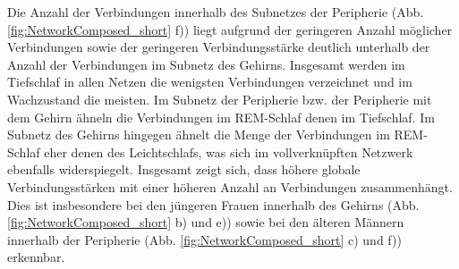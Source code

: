 Die Anzahl der Verbindungen innerhalb des Subnetzes der Peripherie (Abb. \ref{fig:NetworkComposed_short} f)) liegt aufgrund der geringeren Anzahl möglicher Verbindungen sowie der geringeren Verbindungsstärke deutlich unterhalb der Anzahl der Verbindungen im Subnetz des Gehirns. Insgesamt werden im Tiefschlaf in allen Netzen die wenigsten Verbindungen verzeichnet und im Wachzustand die meisten. Im Subnetz der Peripherie bzw. der Peripherie mit dem Gehirn ähneln die Verbindungen im \acs{REM}-Schlaf denen im Tiefschlaf. Im Subnetz des Gehirns hingegen ähnelt die Menge der Verbindungen im \acs{REM}-Schlaf eher denen des Leichtschlafs, was sich im vollverknüpften Netzwerk ebenfalls widerspiegelt. Insgesamt zeigt sich, dass höhere globale Verbindungsstärken mit einer höheren Anzahl an Verbindungen zusammenhängt. Dies ist insbesondere bei den jüngeren Frauen innerhalb des Gehirns (Abb. \ref{fig:NetworkComposed_short} b) und e)) sowie bei den älteren Männern innerhalb der Peripherie (Abb. \ref{fig:NetworkComposed_short} c) und f)) erkennbar.\\

